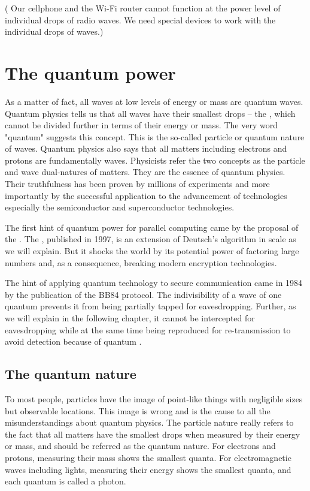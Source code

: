 \documentclass[Letter,11pt]{book}
\begin{document}
( Our cellphone and the Wi-Fi router cannot function at the power level of individual drops of radio waves. We need special devices to work with the individual drops of waves.)

\section{The quantum power}
 As a matter of fact, all waves at low levels of energy or mass are quantum waves. Quantum physics tells us that all waves have their smallest drops -- the , which cannot be divided further in terms of their energy or mass. The very word "quantum" suggests this concept. This is the so-called particle or quantum nature of waves.
Quantum physics also says that all matters including electrons and protons are fundamentally waves. Physicists refer the two concepts as the particle and wave dual-natures of matters. They are the essence of quantum physics. Their truthfulness has been proven by millions of experiments and more importantly by the successful application to the advancement of technologies especially the semiconductor and superconductor technologies.

The first hint of quantum power for parallel computing came by the proposal of the \cite{1985Deutsch}. The , published in 1997, is an extension of Deutsch's algorithm in scale as we will explain. But it shocks the world by its potential power of factoring large numbers and, as a consequence, breaking modern encryption technologies.

The hint of applying quantum technology to secure communication came in 1984 by the publication of the BB84 protocol\cite{BB84}. The indivisibility of a wave of one quantum prevents it from being partially tapped for eavesdropping. Further, as we will explain in the following chapter, it cannot be intercepted for eavesdropping while at the same time being reproduced for re-transmission to avoid detection because of quantum .

\subsection{The quantum nature}
To most people, particles have the image of point-like things with negligible sizes but observable locations. This image is wrong and is the cause to all the misunderstandings about quantum physics. The particle nature really refers to the fact that all matters have the smallest drops when measured by their energy or mass, and should be referred as the quantum nature. For electrons and protons, measuring their mass shows the smallest quanta. For electromagnetic waves including lights, measuring their energy shows the smallest quanta, and each quantum is called a photon.
\end{document}
